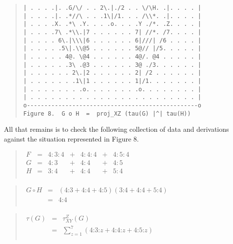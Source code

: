 \documentclass[12pt]{article}
\begin{document}
\begin{quote}
\begin{verbatim}
| . . . .|. .G/\/ . . 2\.|./2 . . \/\H. .|. . . . |
| . . . .|. .*//\ . . .1\|/1. . . /\\*. .|. . . . |
| . . . .X. .*\ .Y. . . .o. . . .Y ./*. .Z. . . . |
| . . . .7\ .*\\.|7 . . . . . . 7| //*. /7. . . . |
| . . . . 6\.|\\\|6 . . . . . . 6|///| /6 . . . . |
| . . . . .5\|.\\@5 . . . . . . 5@// |/5. . . . . |
| . . . . . 4@. \@4 . . . . . . 4@/. @4 . . . . . |
| . . . . . .3\ .@3 . . . . . . 3@ ./3. . . . . . |
| . . . . . . 2\.|2 . . . . . . 2| /2 . . . . . . |
| . . . . . . .1\|1 . . . . . . 1|/1. . . . . . . |
| . . . . . . . .o. . . . . . . .o. . . . . . . . |
| . . . . . . . . . . . . . . . . . . . . . . . . |
o-------------------------------------------------o
Figure 8.  G o H  =  proj_XZ (tau(G) |^| tau(H))
\end{verbatim}\end{quote}

All that remains is to check the following collection of data and derivations against the situation represented in Figure 8.

\begin{quote}$\begin{array}{ccccccc}
F & = & 4:3:4 & + & 4:4:4 & + & 4:5:4 \\
G & = &  4:3  & + &  4:4  & + &  4:5  \\
H & = &  3:4  & + &  4:4  & + &  5:4  \\
\end{array}$\end{quote}

\begin{quote}$\begin{array}{lcc}
G \circ H & = & (4\mbox{:}3 + 4\mbox{:}4 + 4\mbox{:}5)(3\mbox{:}4 + 4\mbox{:}4 + 5\mbox{:}4) \\
          & = & 4\mbox{:}4 \\
\end{array}$\end{quote}

\begin{quote}$\begin{array}{lcc}
\tau(G) & = & \tau_{XY}^Z(G) \\
        & = & \sum_{z=1}^7 (4\mbox{:}3\mbox{:}z + 4\mbox{:}4\mbox{:}z + 4\mbox{:}5\mbox{:}z) \\
\end{array}$\end{quote}
\end{document}
